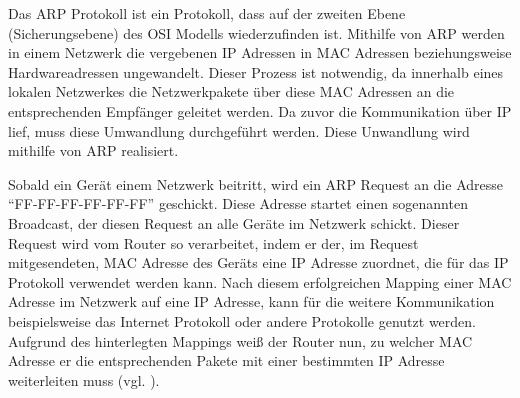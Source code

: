 Das \ac{ARP} Protokoll ist ein Protokoll, dass auf der zweiten Ebene (Sicherungsebene) des \ac{OSI} Modells wiederzufinden ist. Mithilfe von \ac{ARP} werden in einem Netzwerk die vergebenen \ac{IP} Adressen in \ac{MAC} Adressen beziehungsweise Hardwareadressen ungewandelt. Dieser Prozess ist notwendig, da innerhalb eines lokalen Netzwerkes die Netzwerkpakete über diese \ac{MAC} Adressen an die entsprechenden Empfänger geleitet werden. Da zuvor die Kommunikation über \ac{IP} lief, muss diese Umwandlung durchgeführt werden. 
Diese Unwandlung wird mithilfe von \ac{ARP} realisiert. 

Sobald ein Gerät einem Netzwerk beitritt, wird ein \ac{ARP} Request an die Adresse ``FF-FF-FF-FF-FF-FF'' geschickt. Diese Adresse startet einen sogenannten Broadcast, der diesen Request an alle Geräte im Netzwerk schickt. Dieser Request wird vom Router so verarbeitet, indem er der, im Request mitgesendeten, MAC Adresse des Geräts eine \ac{IP} Adresse zuordnet, die für das IP Protokoll verwendet werden kann. Nach diesem erfolgreichen Mapping einer \ac{MAC} Adresse im Netzwerk auf eine \ac{IP} Adresse, kann für die weitere Kommunikation beispielsweise  das Internet Protokoll oder andere Protokolle genutzt werden. Aufgrund des hinterlegten Mappings weiß der Router nun, zu welcher \ac{MAC} Adresse er die entsprechenden Pakete mit einer bestimmten \ac{IP} Adresse weiterleiten muss (vgl. \cite{.r}\cite{.s}).